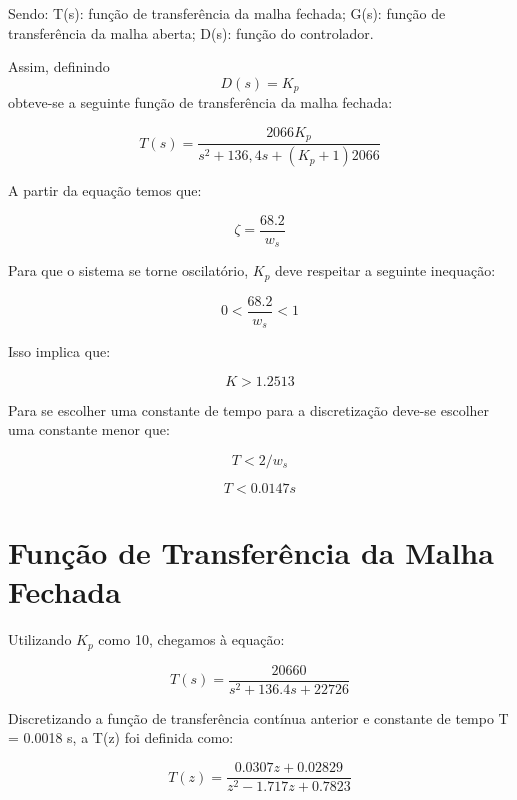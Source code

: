 \documentclass[
oneside,					%
a4paper,					%
english,					%
brazil,					%
]{abntex2}
\begin{document}
Sendo:
T(s): função de transferência da malha fechada;
G(s): função de transferência da malha aberta;
D(s): função do controlador.

Assim, definindo 
\begin{equation} 
D(s) = K_p
\end{equation}
obteve-se a seguinte função de transferência da malha fechada:

\begin{equation} 
T(s) = \frac{2066K_p}{s^2 + 136,4s + (K_p +1)2066}
\end{equation}

A partir da equação temos que:

\begin{equation}
\zeta = \frac{68.2}{w_s}
\end{equation}

Para que o sistema se torne oscilatório, $K_p$ deve respeitar a seguinte inequação:

\begin{equation}
0 < \frac{68.2}{w_s} < 1
\end{equation} 

Isso implica que:

\begin{equation}
K > 1.2513
\end{equation}

Para se escolher uma constante de tempo para a discretização deve-se escolher uma constante menor que:

\begin{equation}
T < 2/w_s
\end{equation}

\begin{equation}
T < 0.0147 s
\end{equation}


\section{Função de Transferência da Malha Fechada}


Utilizando $K_p$ como 10, chegamos à equação:

\begin{equation}
	T(s) =  \frac{20660}{s^2 + 136.4 s + 22726}
\end{equation}


Discretizando a função de transferência contínua anterior e constante de tempo T = 0.0018 s, a T(z) foi definida como:

\begin{equation} 
T(z) = \frac{0.0307 z + 0.02829}{z^2 - 1.717 z + 0.7823}
\end{equation}
\end{document}
